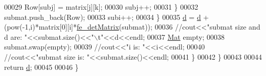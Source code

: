 \begin{DoxyCode}
00029                     Row[subj] = matrix[j][k];
00030                     subj++;
00031                 \}
00032             submat.push\_back(Row);
00033             subi++;
00034             \}
00035         \hyperlink{fe__det_matrix_8cpp_a873684cefeb665f3d5e6b495de57fc0d}{d} = \hyperlink{fe__det_matrix_8cpp_a873684cefeb665f3d5e6b495de57fc0d}{d} + (pow(-1,i)*matrix[0][i]*\hyperlink{fe__det_matrix_8cpp_a715b940baf396c94255779d0573d9957}{fe\_detMatrix}(submat));
00036         \textcolor{comment}{//cout<<"submat size and d are: "<<submat.size()<<"\(\backslash\)t"<<d<<endl;}
00037         \hyperlink{fe__det_matrix_8cpp_a1356201aa606214a43dbef76118a8c20}{Mat} empty;
00038         submat.swap(empty);
00039         \textcolor{comment}{//cout<<"i is: "<<i<<endl;}
00040         \textcolor{comment}{//cout<<"submat size is: "<<submat.size()<<endl;}
00041         \}
00042     \}
00043     
00044     \textcolor{keywordflow}{return} \hyperlink{fe__det_matrix_8cpp_a873684cefeb665f3d5e6b495de57fc0d}{d};
00045 
00046 \}
\end{DoxyCode}
